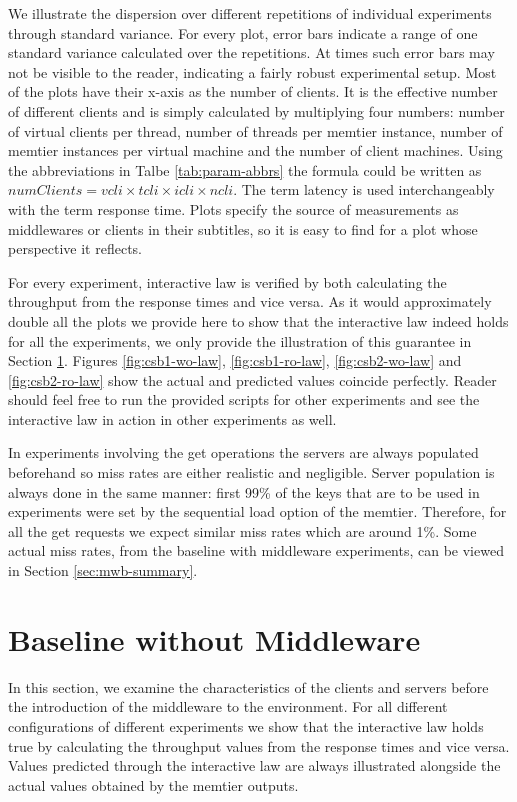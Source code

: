 \documentclass[11pt,a4paper]{article}
\begin{document}
\par We illustrate the dispersion over different repetitions of individual experiments through standard variance. For every plot, error bars indicate a range of one standard variance calculated over the repetitions. At times such error bars may not be visible to the reader, indicating a fairly robust experimental setup. Most of the plots have their x-axis as the number of clients. It is the effective number of different clients and is simply calculated by multiplying four numbers: number of virtual clients per thread, number of threads per memtier instance, number of memtier instances per virtual machine and the number of client machines. Using the abbreviations in Talbe \ref{tab:param-abbrs} the formula could be written as $numClients = vcli \times tcli \times icli \times ncli$. The term latency is used interchangeably with the term response time. Plots specify the source of measurements as middlewares or clients in their subtitles, so it is easy to find for a plot whose perspective it reflects.
\par For every experiment, interactive law is verified by both calculating the throughput from the response times and vice versa. As it would approximately double all the plots we provide here to show that the interactive law indeed holds for all the experiments, we only provide the illustration of this guarantee in Section \ref{sec:csb}. Figures \ref{fig:csb1-wo-law}, \ref{fig:csb1-ro-law}, \ref{fig:csb2-wo-law} and \ref{fig:csb2-ro-law} show the actual and predicted values coincide perfectly. Reader should feel free to run the provided scripts for other experiments and see the interactive law in action in other experiments as well.
\\
\par In  experiments involving the get operations the servers are always populated beforehand so miss rates are either realistic and negligible. Server population is always done in the same manner: first 99\% of the keys that are to be used in experiments were set by the sequential load option of the memtier. Therefore, for all the get requests we expect similar miss rates which are around 1\%. Some actual miss rates, from the baseline with middleware experiments, can be viewed in Section \ref{sec:mwb-summary}.


\section{Baseline without Middleware} \label{sec:csb}
In this section, we examine the characteristics of the clients and servers before the introduction of the middleware to the environment. For all different configurations of different experiments we show that the interactive law holds true by calculating the throughput values from the response times and vice versa. Values predicted through the interactive law are always illustrated alongside the actual values obtained by the memtier outputs.
\end{document}
